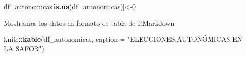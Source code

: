 \documentclass[
]{article}
\newenvironment{Shaded}{\begin{snugshade}}{\end{snugshade}}
\newcommand{\AttributeTok}[1]{\textcolor[rgb]{0.13,0.29,0.53}{#1}}
\newcommand{\DecValTok}[1]{\textcolor[rgb]{0.00,0.00,0.81}{#1}}
\newcommand{\FunctionTok}[1]{\textcolor[rgb]{0.13,0.29,0.53}{\textbf{#1}}}
\newcommand{\NormalTok}[1]{#1}
\newcommand{\OtherTok}[1]{\textcolor[rgb]{0.56,0.35,0.01}{#1}}
\newcommand{\SpecialCharTok}[1]{\textcolor[rgb]{0.81,0.36,0.00}{\textbf{#1}}}
\newcommand{\StringTok}[1]{\textcolor[rgb]{0.31,0.60,0.02}{#1}}
\begin{document}
\begin{Shaded}
\begin{Highlighting}[]
\NormalTok{df\_autonomicas[}\FunctionTok{is.na}\NormalTok{(df\_autonomicas)]}\OtherTok{\textless{}{-}}\DecValTok{0}
\end{Highlighting}
\end{Shaded}

Mostramos los datos en formato de tabla de RMarkdown

\begin{Shaded}
\begin{Highlighting}[]
\NormalTok{knitr}\SpecialCharTok{::}\FunctionTok{kable}\NormalTok{(df\_autonomicas, }\AttributeTok{caption =} \StringTok{"ELECCIONES AUTONÓMICAS EN LA SAFOR"}\NormalTok{)}
\end{Highlighting}
\end{Shaded}
\end{document}
